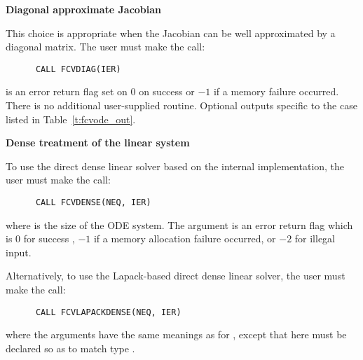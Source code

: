 \begin{Steps}

  {\bf Diagonal approximate Jacobian}
  
  This choice is appropriate when the Jacobian can be well approximated by
  a diagonal matrix.  The user must make the call:
\begin{verbatim}
      CALL FCVDIAG(IER)
\end{verbatim}
   is an error return flag set on $0$ on success or $-1$ if a memory 
  failure occurred.
  There is no additional user-supplied routine. Optional outputs specific
  to the {\diag} case listed in Table~\ref{t:fcvode_out}.
  

  {\bf Dense treatment of the linear system}
  
  To use the direct dense linear solver based on the internal {\cvode}
  implementation, the user must make the call:
\begin{verbatim}
      CALL FCVDENSE(NEQ, IER)
\end{verbatim}
  where  is the size of the ODE system.
  The argument  is an error return flag which is $0$ for success , 
  $-1$ if a memory allocation failure occurred, or $-2$ for illegal input.

  Alternatively, to use the Lapack-based direct dense linear solver, 
  the user must make the call:
\begin{verbatim}
      CALL FCVLAPACKDENSE(NEQ, IER)
\end{verbatim}
  where the arguments have the same meanings as for , except
  that here  must be declared so as to match {\CC} type .


\end{Steps}

